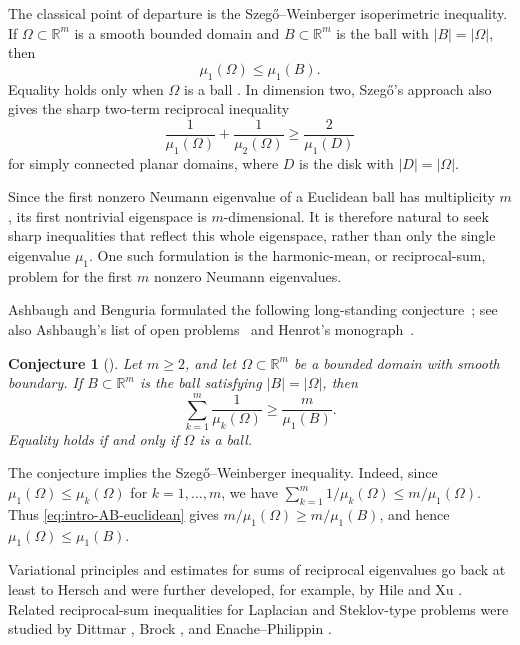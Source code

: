 \documentclass[11pt,letterpaper,reqno]{amsart}
\newtheorem{conjecture}[theorem]{Conjecture}
\theoremstyle{definition}
\newcommand{\R}{\mathbb R}
\begin{document}
The classical point of departure is the Szeg\H{o}--Weinberger
isoperimetric inequality. If \(\Omega\subset\R^m\) is a smooth bounded
domain and \(B\subset\R^m\) is the ball with \(|B|=|\Omega|\), then
\[
        \mu_1(\Omega)\le \mu_1(B).
\]
Equality holds only when \(\Omega\) is a ball \cite{Sze54,Wei56}. In dimension two, Szeg\H{o}'s approach also gives the sharp two-term reciprocal inequality
\[
        \frac1{\mu_1(\Omega)}+\frac1{\mu_2(\Omega)}
        \ge
        \frac2{\mu_1(D)}
\]
for simply connected planar domains, where \(D\) is the disk with
\(|D|=|\Omega|\).


Since the first nonzero Neumann eigenvalue of a Euclidean ball has
multiplicity \(m\), its first nontrivial eigenspace is \(m\)-dimensional.
It is therefore natural to seek sharp inequalities that reflect this
whole eigenspace, rather than only the single eigenvalue \(\mu_1\). One
such formulation is the harmonic-mean, or reciprocal-sum, problem for the
first \(m\) nonzero Neumann eigenvalues.


Ashbaugh and Benguria formulated the following long-standing conjecture~\cite{AB93}; see also Ashbaugh's list of open problems~\cite{Ashbaugh99} and Henrot's monograph~\cite{Henrot06}.



\begin{conjecture}[\cite{AB93}]\label{conj:AB-euclidean}
Let \(m\geq2\), and let \(\Omega\subset\R^m\) be a bounded domain with smooth boundary. If \(B\subset\R^m\) is the ball satisfying \(|B|=|\Omega|\), then
\begin{equation}\label{eq:intro-AB-euclidean}
        \sum_{k=1}^m \frac1{\mu_k(\Omega)}
        \ge
        \frac{m}{\mu_1(B)}.
\end{equation}
Equality holds if and only if \(\Omega\) is a ball.
\end{conjecture}



The conjecture implies the Szeg\H{o}--Weinberger inequality. Indeed, since \(\mu_1(\Omega)\leq \mu_k(\Omega)\) for \(k=1,\ldots,m\), we have \(\sum_{k=1}^m 1/\mu_k(\Omega) \leq m/\mu_1(\Omega)\). Thus \eqref{eq:intro-AB-euclidean} gives \(m/\mu_1(\Omega)\ge m/\mu_1(B)\), and hence \(\mu_1(\Omega)\le \mu_1(B)\).

Variational principles and estimates for sums of reciprocal eigenvalues
go back at least to Hersch \cite{Her61} and were further developed, for
example, by Hile and Xu \cite{HX93}. Related reciprocal-sum inequalities
for Laplacian and Steklov-type problems were studied by Dittmar
\cite{Dit02}, Brock \cite{Bro01}, and Enache--Philippin \cite{EP13}.
\end{document}
